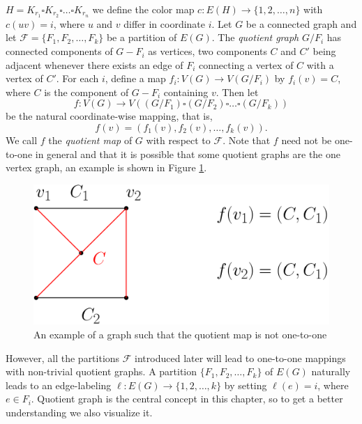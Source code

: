 \documentclass[12pt,a4paper,titlepage,openany]{report}
\begin{document}
$H=K_{r_1}\square K_{r_2}\square \ldots \square K_{r_n}$ we define the color map $c:E(H)\rightarrow \{1,2,\ldots, n\}$ with $c(uv)=i$, where $u$ and $v$ differ in coordinate $i$.
\newline
Let $G$ be a connected graph and let $\mathcal{F}=\{F_1,F_2,\ldots, F_k\}$ be a partition of $E(G)$. The \textit{quotient graph} $G/ F_i$ has connected components of $G- F_i$ as vertices, two components $C$ and $C'$ being adjacent whenever there exists an edge of $F_i$ connecting a vertex of $C$ with a vertex of $C'$. For each $i$, define a map $f_i:V(G)\rightarrow V(G/ F_i)$ by $f_i(v)=C$, where $C$ is the component of $G- F_i$ containing $v$. Then let
$$f:V(G)\to V((G/ F_1)\square (G/ F_2)\square \ldots \square (G/ F_k))$$
be the natural coordinate-wise mapping, that is,
$$f(v)=(f_1(v),f_2(v),\ldots , f_k(v)).$$
We call $f$ the \textit{quotient map} of $G$ with respect to $\mathcal{F}$. Note that $f$ need not be one-to-one in general and that it is possible that some quotient graphs are the one vertex graph, an example is shown in Figure \ref{fnotonetoone}.
\begin{figure}[h]
\begin{center}
\includegraphics[width=0.75\linewidth]{figures/fnotonetoone.png}
\end{center}
\caption{An example of a graph such that the quotient map is not one-to-one}\label{fnotonetoone}
\end{figure}
 However, all the partitions $\mathcal{F}$ introduced later will lead to one-to-one mappings with non-trivial quotient graphs.\newline
A partition $\{F_1,F_2,\ldots ,F_k\}$ of $E(G)$ naturally leads to an edge-labeling $\ell:E(G)\to \{1,2,\ldots,k\}$ by setting $\ell(e)=i$, where $e\in F_i$.
\newline 
Quotient graph is the central concept in this chapter, so to get a better understanding we also visualize it.
\end{document}
